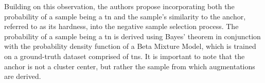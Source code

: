 Building on this observation, the authors propose incorporating both the probability of a sample being a \ac{tn} and 
the sample's similarity to the anchor, referred to as its hardness, into the negative sample selection process. 
The probability of a sample being a \ac{tn} is derived using Bayes' theorem in conjunction with 
the probability density function of a Beta Mixture Model, 
which is trained on a ground-truth dataset comprised of \acp{tn}.
It is important to note that the anchor is not a cluster center, 
but rather the sample from which augmentations are derived.

